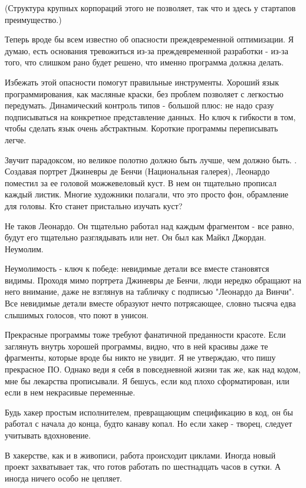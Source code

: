 \documentclass[ebook,12pt,oneside,openany]{memoir}
\begin{document}
(Структура крупных корпораций этого не позволяет, так что и здесь у
стартапов преимущество.)

Теперь вроде бы всем известно об опасности преждевременной
оптимизации. Я думаю, есть основания тревожиться из-за преждевременной
разработки - из-за того, что слишком рано будет решено, что именно
программа должна делать.

Избежать этой опасности помогут правильные инструменты. Хороший язык
программирования, как масляные краски, без проблем позволяет с
легкостью передумать. Динамический контроль типов - большой плюс: не
надо сразу подписываться на конкретное представление данных. Но ключ к
гибкости в том, чтобы сделать язык очень абстрактным. Короткие
программы переписывать легче.

Звучит парадоксом, но великое полотно должно быть лучше, чем должно
быть. . Создавая портрет Джиневры де Бенчи (Национальная галерея),
Леонардо поместил за ее головой можжевеловый куст. В нем он тщательно
прописал каждый листик. Многие художники полагали, что это просто фон,
обрамление для головы. Кто станет пристально изучать куст?

Не таков Леонардо. Он тщательно работал над каждым фрагментом - все
равно, будут его тщательно разглядывать или нет. Он был как Майкл
Джордан. Неумолим.

Неумолимость - ключ к победе: невидимые детали все вместе становятся
видимы. Проходя мимо портрета Джиневры де Бенчи, люди нередко обращают
на него внимание, даже не взглянув на табличку с подписью "Леонардо да
Винчи". Все невидимые детали вместе образуют нечто потрясающее, словно
тысяча едва слышимых голосов, что поют в унисон.

Прекрасные программы тоже требуют фанатичной преданности красоте. Если
заглянуть внутрь хорошей программы, видно, что в ней красивы даже те
фрагменты, которые вроде бы никто не увидит. Я не утверждаю, что пишу
прекрасное ПО. Однако веди я себя в повседневной жизни так же, как над
кодом, мне бы лекарства прописывали. Я бешусь, если код плохо
сформатирован, или если в нем некрасивые переменные.

Будь хакер простым исполнителем, превращающим спецификацию в код, он
бы работал с начала до конца, будто канаву копал. Но если хакер -
творец, следует учитывать вдохновение.

В хакерстве, как и в живописи, работа происходит циклами. Иногда новый
проект захватывает так, что готов работать по шестнадцать часов в
сутки. А иногда ничего особо не цепляет.
\end{document}
